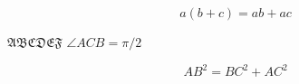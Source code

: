 \documentclass[UTF8]{ctexart}
\begin{document}
\begin{equation}
a(b+c) = ab + ac
\end{equation}

$\mathfrak{ABCDEF} $
$\angle ACB = \pi /2 $

\begin{equation}
AB^2 = BC^2 + AC^2
\end{equation}
\end{document}

